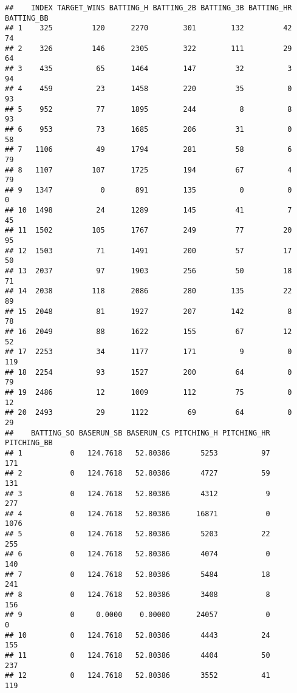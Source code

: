 \documentclass[
]{article}
\begin{document}
\begin{verbatim}
##    INDEX TARGET_WINS BATTING_H BATTING_2B BATTING_3B BATTING_HR BATTING_BB
## 1    325         120      2270        301        132         42         74
## 2    326         146      2305        322        111         29         64
## 3    435          65      1464        147         32          3         94
## 4    459          23      1458        220         35          0         93
## 5    952          77      1895        244          8          8         93
## 6    953          73      1685        206         31          0         58
## 7   1106          49      1794        281         58          6         79
## 8   1107         107      1725        194         67          4         79
## 9   1347           0       891        135          0          0          0
## 10  1498          24      1289        145         41          7         45
## 11  1502         105      1767        249         77         20         95
## 12  1503          71      1491        200         57         17         50
## 13  2037          97      1903        256         50         18         71
## 14  2038         118      2086        280        135         22         89
## 15  2048          81      1927        207        142          8         78
## 16  2049          88      1622        155         67         12         52
## 17  2253          34      1177        171          9          0        119
## 18  2254          93      1527        200         64          0         79
## 19  2486          12      1009        112         75          0         12
## 20  2493          29      1122         69         64          0         29
##    BATTING_SO BASERUN_SB BASERUN_CS PITCHING_H PITCHING_HR PITCHING_BB
## 1           0   124.7618   52.80386       5253          97         171
## 2           0   124.7618   52.80386       4727          59         131
## 3           0   124.7618   52.80386       4312           9         277
## 4           0   124.7618   52.80386      16871           0        1076
## 5           0   124.7618   52.80386       5203          22         255
## 6           0   124.7618   52.80386       4074           0         140
## 7           0   124.7618   52.80386       5484          18         241
## 8           0   124.7618   52.80386       3408           8         156
## 9           0     0.0000    0.00000      24057           0           0
## 10          0   124.7618   52.80386       4443          24         155
## 11          0   124.7618   52.80386       4404          50         237
## 12          0   124.7618   52.80386       3552          41         119

\end{verbatim}
\end{document}
